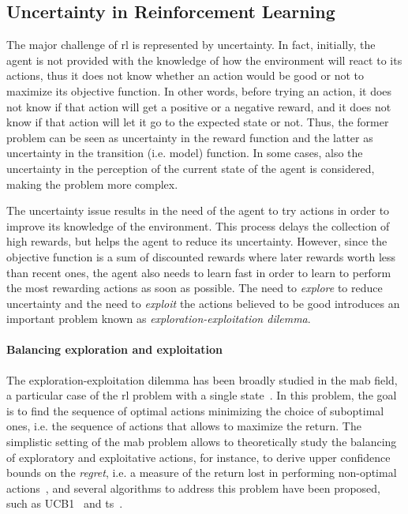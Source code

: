 \subsection{Uncertainty in Reinforcement Learning}
The major challenge of \gls{rl} is represented by uncertainty. In fact, initially, the agent is not provided with the knowledge of how the environment will react to its actions, thus it does not know whether an action would be good or not to maximize its objective function. In other words, before trying an action, it does not know if that action will get a positive or a negative reward, and it does not know if that action will let it go to the expected state or not. Thus, the former problem can be seen as uncertainty in the reward function and the latter as uncertainty in the transition (i.e. model) function. In some cases, also the uncertainty in the perception of the current state of the agent is considered, making the problem more complex.

The uncertainty issue results in the need of the agent to try actions in order to improve its knowledge of the environment. This process delays the collection of high rewards, but helps the agent to reduce its uncertainty. However, since the objective function is a sum of discounted rewards where later rewards worth less than recent ones, the agent also needs to learn fast in order to learn to perform the most rewarding actions as soon as possible. The need to \textit{explore} to reduce uncertainty and the need to \textit{exploit} the actions believed to be good introduces an important problem known as \textit{exploration-exploitation dilemma}.

\paragraph{Balancing exploration and exploitation}
The exploration-exploitation dilemma has been broadly studied in the \gls{mab} field, a particular case of the \gls{rl} problem with a single state~\cite{lai1985asymptotically}. In this problem, the goal is to find the sequence of optimal actions minimizing the choice of suboptimal ones, i.e. the sequence of actions that allows to maximize the return. The simplistic setting of the \gls{mab} problem allows to theoretically study the balancing of exploratory and exploitative actions, for instance, to derive upper confidence bounds on the \textit{regret}, i.e. a measure of the return lost in performing non-optimal actions~\cite{bubeck2012regret, agrawal2012analysis, vermorel2005multi}, and several algorithms to address this problem have been proposed, such as UCB1~\cite{auer2002finite} and \gls{ts}~\cite{thompson1933likelihood}.


